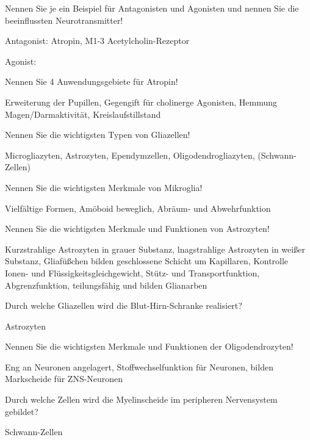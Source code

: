 \documentclass[10pt, a4paper]{exam}
\begin{document}
\begin{questions}
  \question Nennen Sie je ein Beispiel für Antagonisten und Agonisten und nennen Sie die beeinflussten Neurotransmitter!
  \begin{solution}
    \begin{itemize*}
      \item Antagonist: Atropin, M1-3 Acetylcholin-Rezeptor
      \item Agonist:
    \end{itemize*}
  \end{solution}

  \question Nennen Sie 4 Anwendungsgebiete für Atropin!
  \begin{solution}
    Erweiterung der Pupillen, Gegengift für cholinerge Agonisten, Hemmung Magen/Darmaktivität, Kreislaufstillstand
  \end{solution}

  \question Nennen Sie die wichtigsten Typen von Gliazellen!
  \begin{solution}
    Microgliazyten, Astrozyten, Ependymzellen, Oligodendrogliazyten, (Schwann-Zellen)
  \end{solution}

  \question Nennen Sie die wichtigsten Merkmale von Mikroglia!
  \begin{solution}
    Vielfältige Formen, Amöboid beweglich, Abräum- und Abwehrfunktion
  \end{solution}

  \question Nennen Sie die wichtigsten Merkmale und Funktionen von Astrozyten!
  \begin{solution}
    Kurzstrahlige Astrozyten in grauer Substanz, lnagstrahlige Astrozyten in weißer Substanz, Gliafüßchen bilden geschlossene Schicht um Kapillaren, Kontrolle Ionen- und Flüssigkeitsgleichgewicht, Stütz- und Transportfunktion, Abgrenzfunktion, teilungsfähig und bilden Glianarben
  \end{solution}

  \question Durch welche Gliazellen wird die Blut-Hirn-Schranke realisiert?
  \begin{solution}
    Astrozyten
  \end{solution}

  \question Nennen Sie die wichtigsten Merkmale und Funktionen der Oligodendrozyten!
  \begin{solution}
    Eng an Neuronen angelagert, Stoffwechselfunktion für Neuronen, bilden Markscheide für ZNS-Neuronen
  \end{solution}

  \question Durch welche Zellen wird die Myelinscheide im peripheren Nervensystem gebildet?
  \begin{solution}
    Schwann-Zellen
  \end{solution}


\end{questions}
\end{document}

